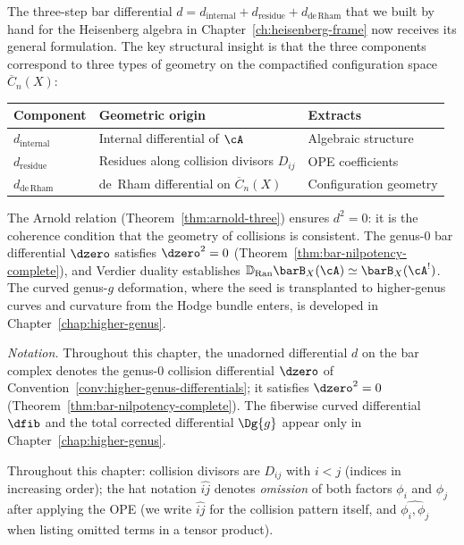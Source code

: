 The three-step bar differential
$d = d_{\mathrm{internal}} + d_{\mathrm{residue}}
+ d_{\mathrm{de\,Rham}}$ that we built by hand for the Heisenberg
algebra in Chapter~\ref{ch:heisenberg-frame} now receives its general
formulation.  The key structural insight is that the three components
correspond to three types of geometry on the compactified
configuration space $\overline{C}_n(X)$:
\begin{center}
\small
\begin{tabular}{lll}
\textbf{Component} & \textbf{Geometric origin} & \textbf{Extracts} \\
\hline
$d_{\mathrm{internal}}$ & Internal differential of $\cA$ & Algebraic structure \\
$d_{\mathrm{residue}}$ & Residues along collision divisors $D_{ij}$ & OPE coefficients \\
$d_{\mathrm{de\,Rham}}$ & de~Rham differential on $\overline{C}_n(X)$ & Configuration geometry
\end{tabular}
\end{center}

\noindent
The Arnold relation
(Theorem~\ref{thm:arnold-three}) ensures $d^2 = 0$: it is the
coherence condition that the geometry of collisions is consistent.
The genus-$0$ bar differential $\dzero$ satisfies $\dzero^2 = 0$
(Theorem~\ref{thm:bar-nilpotency-complete}), and Verdier duality
establishes $\mathbb{D}_{\operatorname{Ran}} \barB_X(\cA) \simeq
\barB_X(\cA^!)$.  The curved genus-$g$ deformation, where the seed is
transplanted to higher-genus curves and curvature from the Hodge
bundle enters, is developed in Chapter~\ref{chap:higher-genus}.

\smallskip
\noindent\textit{Notation.}
Throughout this chapter, the unadorned differential $d$ on the bar complex denotes the genus-$0$ collision differential $\dzero$ of Convention~\ref{conv:higher-genus-differentials}; it satisfies $\dzero^2 = 0$ (Theorem~\ref{thm:bar-nilpotency-complete}).  The fiberwise curved differential $\dfib$ and the total corrected differential $\Dg{g}$ appear only in Chapter~\ref{chap:higher-genus}.

\medskip

\begin{convention}\label{conv:set-notation}
Throughout this chapter: collision divisors are $D_{ij}$ with $i < j$ (indices in increasing order); the hat notation $\widehat{ij}$ denotes \emph{omission} of both factors $\phi_i$ and $\phi_j$ after applying the OPE (we write $\widehat{ij}$ for the collision pattern itself, and $\widehat{\phi_i, \phi_j}$ when listing omitted terms in a tensor product).
\end{convention}

